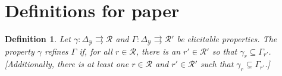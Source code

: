 \documentclass[12pt]{article}
\newcommand{\R}{\mathcal{R}}
\newcommand{\Y}{\mathcal{Y}}
\newcommand{\toto}{\rightrightarrows}
\newtheorem{definition}{Definition}
\begin{document}
\newpage
\section{Definitions for paper}
\begin{definition}
	Let $\gamma:\Delta_\Y \toto \R$ and $\Gamma:\Delta_\Y \toto \R'$ be elicitable properties.
	The property $\gamma$ refines $\Gamma$ if, for all $r \in \R$, there is an $r' \in \R'$ so that $\gamma_r \subseteq \Gamma_{r'}$.
	[Additionally, there is at least one $r \in \R$ and $r' \in \R'$ such that $\gamma_r \subsetneq \Gamma_{r'}$.]
\end{definition}
\end{document}
